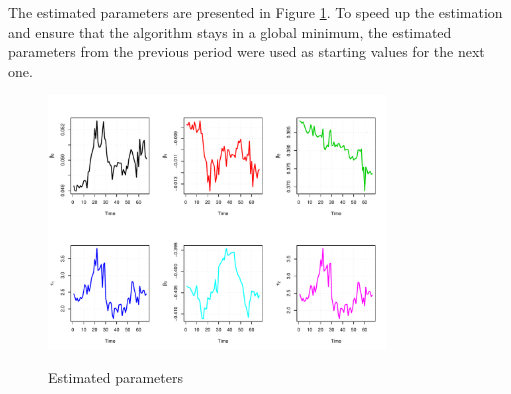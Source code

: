 The estimated parameters are presented in Figure \ref{fig:paramdevel}. To speed up the estimation and ensure that the algorithm stays in a global minimum, the estimated parameters from the previous period were used as starting values for the next one.

\begin{figure}[htb]
  \begin{center}
  \caption{Estimated parameters}
\includegraphics[width=0.8\textwidth]{paramdevel}
\label{fig:paramdevel}
\end{center}
\end{figure}



